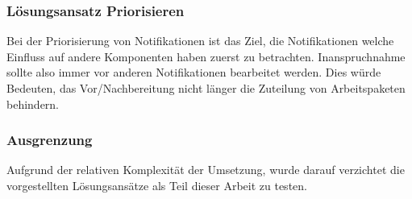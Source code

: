 \subsubsection{Lösungsansatz Priorisieren}
Bei der Priorisierung von Notifikationen ist das Ziel,
die Notifikationen welche Einfluss auf andere Komponenten haben zuerst zu betrachten.
Inanspruchnahme sollte also immer vor anderen Notifikationen bearbeitet werden.
Dies würde Bedeuten, das Vor/Nachbereitung nicht länger die Zuteilung von Arbeitspaketen behindern.

\subsubsection{Ausgrenzung}
Aufgrund der relativen Komplexität der Umsetzung,
wurde darauf verzichtet die vorgestellten Lösungsansätze
als Teil dieser Arbeit zu testen.